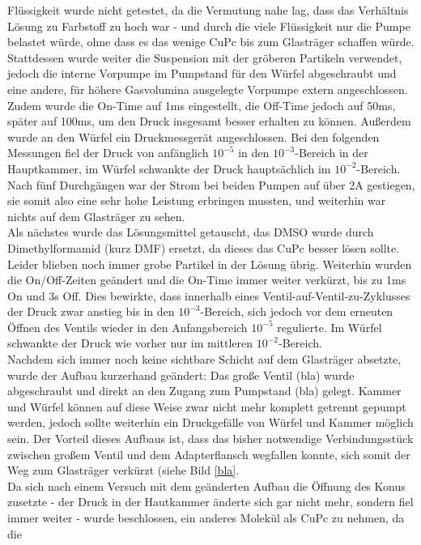 Flüssigkeit wurde nicht getestet, da die Vermutung nahe lag, dass das Verhältnis Lösung zu Farbstoff zu hoch
war - und durch die viele Flüssigkeit nur die Pumpe belastet würde, ohne dass es das wenige CuPc bis zum
Glasträger schaffen würde.\\
Stattdessen wurde weiter die Suspension mit der gröberen Partikeln verwendet, jedoch die interne Vorpumpe im
Pumpstand für den Würfel abgeschraubt und eine andere, für höhere Gasvolumina ausgelegte Vorpumpe extern
angeschlossen. Zudem wurde die On-Time auf 1ms eingestellt, die Off-Time jedoch auf 50ms, später auf 100ms, um
den Druck insgesamt besser erhalten zu können. Außerdem wurde an den Würfel ein Druckmessgerät angeschlossen.
Bei den folgenden Messungen fiel der Druck von anfänglich $10^{-5}$ in den $10^{-3}$-Bereich in der
Hauptkammer, im Würfel schwankte der Druck hauptsächlich im $10^{-2}$-Bereich. Nach fünf Durchgängen war der
Strom bei beiden Pumpen auf über 2A gestiegen, sie somit also eine sehr hohe Leistung erbringen mussten, und
weiterhin war nichts auf dem Glasträger zu sehen.\\
Als nächstes wurde das Lösungsmittel getauscht, das DMSO wurde durch Dimethylformamid (kurz DMF) ersetzt,
da dieses das CuPc besser lösen sollte. Leider blieben noch immer grobe Partikel in der Lösung übrig. Weiterhin
wurden die On/Off-Zeiten geändert und die On-Time immer weiter verkürzt, bis zu 1ms On und 3s Off. Dies
bewirkte, dass innerhalb eines Ventil-auf-Ventil-zu-Zyklusses der Druck zwar anstieg bis in den
$10^{-3}$-Bereich, sich jedoch vor dem erneuten Öffnen des Ventils wieder in den Anfangsbereich $10^{-5}$
regulierte. Im Würfel schwankte der Druck wie vorher nur im mittleren $10^{-2}$-Bereich.\\
Nachdem sich immer noch keine sichtbare Schicht auf dem Glasträger absetzte, wurde der Aufbau kurzerhand
geändert: Das große Ventil (bla) wurde abgeschraubt und direkt an den Zugang zum Pumpstand (bla) gelegt.
Kammer und Würfel können auf diese Weise zwar nicht mehr komplett getrennt gepumpt werden, jedoch sollte
weiterhin ein Druckgefälle von Würfel und Kammer möglich sein. Der Vorteil dieses Aufbaus ist, dass das bisher
notwendige Verbindungsstück zwischen großem Ventil und dem Adapterflansch wegfallen konnte, sich somit der Weg
zum Glasträger verkürzt (siehe Bild \ref{bla}. \\
 Da sich nach einem Versuch mit dem geänderten Aufbau die Öffnung des Konus zusetzte - der Druck in der
 Hautkammer änderte sich gar nicht mehr, sondern fiel immer weiter - wurde beschlossen, ein anderes Molekül als CuPc zu nehmen, da die
